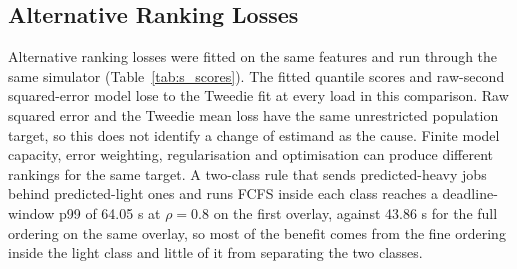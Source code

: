 \documentclass[mathematics,supfile,submit,moreauthors]{Definitions/mdpi}
\newcommand{\devnum}[1]{#1}
\begin{document}
\subsection{Alternative Ranking Losses}
\label{sec:supp_scores}

Alternative ranking losses were fitted on the same features and run through the same
simulator (Table~\ref{tab:s_scores}). The fitted quantile scores and raw-second squared-error model lose to the Tweedie
fit at every load in this comparison. Raw squared error and the Tweedie mean loss
have the same unrestricted population target, so this does not identify a change
of estimand as the cause. Finite model capacity, error weighting, regularisation
and optimisation can produce different rankings for the same target. A two-class rule that
sends predicted-heavy jobs behind predicted-light ones and runs FCFS inside each class reaches a
deadline-window p99 of \devnum{64.05} s at $\rho = \devnum{0.8}$ on the first overlay, against
\devnum{43.86} s for the full ordering on the same overlay, so most of the benefit comes from
the fine ordering inside the light class and little of it from separating the two classes.
\end{document}
